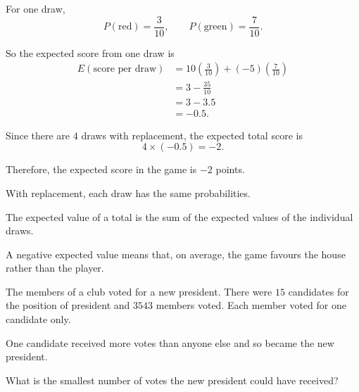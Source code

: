 \begin{solution}
For one draw,
\[
P(\text{red})=\frac{3}{10}, \qquad P(\text{green})=\frac{7}{10}.
\]

So the expected score from one draw is
\begin{align*}
E(\text{score per draw})
&= 10\left(\frac{3}{10}\right) + (-5)\left(\frac{7}{10}\right) \\
&= 3 - \frac{35}{10} \\
&= 3 - 3.5 \\
&= -0.5.
\end{align*}

Since there are $4$ draws with replacement, the expected total score is
\[
4\times (-0.5) = -2.
\]

Therefore, the expected score in the game is $\boxed{-2}$ points.
\end{solution}

\begin{takeaways}
\item With replacement, each draw has the same probabilities.
\item The expected value of a total is the sum of the expected values of the individual draws.
\item A negative expected value means that, on average, the game favours the house rather than the player.
\end{takeaways}

\begin{problem}
The members of a club voted for a new president. There were $15$ candidates for the position of president and $3543$ members voted. Each member voted for one candidate only.

One candidate received more votes than anyone else and so became the new president.

What is the smallest number of votes the new president could have received?
\end{problem}

